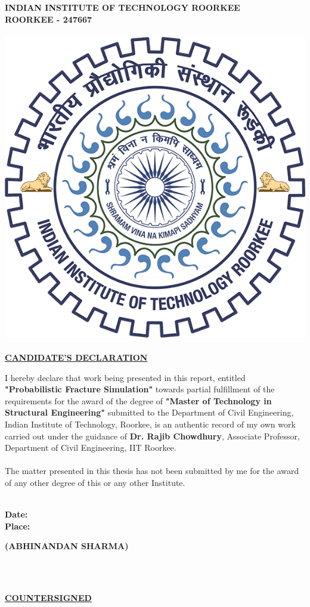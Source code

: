 \documentclass[12pt]{article}
\begin{document}
{%
\begin{center}
\textbf{ \LARGE   INDIAN INSTITUTE OF TECHNOLOGY ROORKEE\\
ROORKEE - 247667\\~\\
\includegraphics[width=.3\textwidth]{iitr.png}\\~\\
\underline{CANDIDATE'S DECLARATION}\\}
\end{center}
\begin{doublespace}
    {\large I hereby declare that work being presented in this report, entitled \textbf{\large "Probabilistic Fracture Simulation"} 
    towards partial fulfillment of the requirements for the award of the degree of \textbf{\large "Master of Technology in Structural Engineering"}
    submitted to
    the Department of Civil Engineering, Indian Institute of Technology, Roorkee, is an authentic
    record of my own work carried out under the guidance of \textbf{Dr. Rajib Chowdhury}, Associate
    Professor, Department of Civil Engineering, IIT Roorkee.\\~\\
    The matter presented in this thesis has not been submitted by me for the award of any other
    degree of this or any other Institute. \\~\\
    }    
\end{doublespace}
\begin{minipage}[t]{7cm}\bf
\flushleft
Date:\\Place:\\
\end{minipage}
\hfill
\begin{minipage}[t]{7cm}\bf
\flushright
(ABHINANDAN SHARMA)\\
\end{minipage}
\\~\\
\begin{center}\bf
    \LARGE \underline{COUNTERSIGNED}\\

\end{center}}
\end{document}

